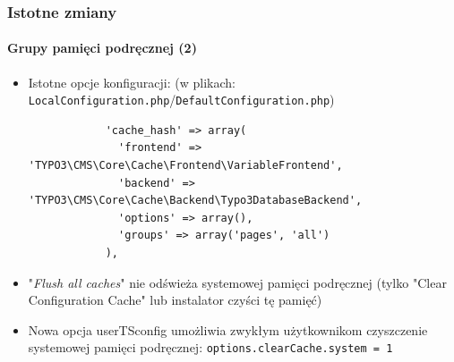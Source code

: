 \begin{frame}[fragile]
	\frametitle{Istotne zmiany}
	\framesubtitle{Grupy pamięci podręcznej (2)}

	\lstset{
		basicstyle=\tiny\ttfamily
	}

	\begin{itemize}

		\item Istotne opcje konfiguracji:\newline
			\smaller(w plikach: \texttt{LocalConfiguration.php}/\texttt{DefaultConfiguration.php})\normalsize

			\begin{lstlisting}
			'cache_hash' => array(
			  'frontend' => 'TYPO3\CMS\Core\Cache\Frontend\VariableFrontend',
			  'backend' => 'TYPO3\CMS\Core\Cache\Backend\Typo3DatabaseBackend',
			  'options' => array(),
			  'groups' => array('pages', 'all')
			),
			\end{lstlisting}

		\item "\textit{Flush all caches}" nie odświeża systemowej pamięci podręcznej
			(tylko "Clear Configuration Cache" lub instalator czyści tę pamięć)
		\item Nowa opcja userTSconfig  umożliwia zwykłym użytkownikom czyszczenie systemowej pamięci podręcznej:\newline
			\smaller \texttt{options.clearCache.system = 1}\normalsize

		\breakingchange

	\end{itemize}

\end{frame}


